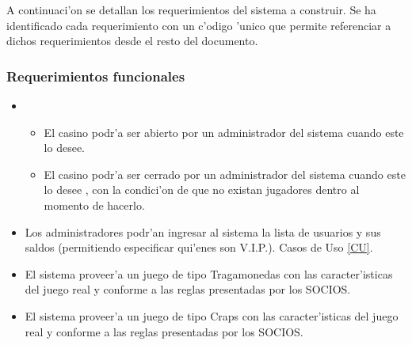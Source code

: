 A continuaci'on se detallan los requerimientos del sistema a construir. Se ha identificado cada requerimiento con un c'odigo 'unico que permite referenciar a dichos requerimientos desde el resto del documento.

\subsubsection{Requerimientos funcionales}



\begin{itemize}

\item {} 

    \begin{itemize}
        \item El casino podr'a ser abierto por un administrador del sistema cuando este lo desee. 
        \item El casino podr'a ser cerrado por un administrador del sistema cuando este lo desee , con la condici'on de que no existan jugadores dentro al momento de hacerlo.
    \end{itemize}
 
\item {} 
    Los administradores podr'an ingresar al sistema la lista de usuarios y sus saldos (permitiendo especificar qui'enes son V.I.P.).
    Casos de Uso \ref{CU}.

\item {} 

    El sistema proveer'a un juego de tipo Tragamonedas con las caracter'isticas del juego real y conforme a las reglas presentadas por los SOCIOS.
    


\item {}

    El sistema proveer'a un juego de tipo Craps con las caracter'isticas del juego real y conforme a las reglas presentadas por los SOCIOS.


\end{itemize}
